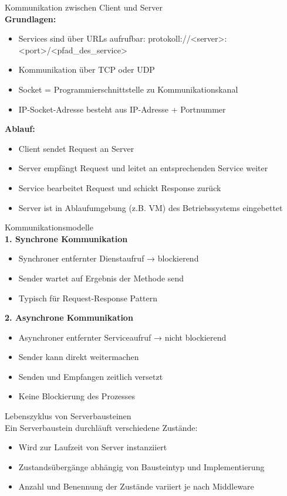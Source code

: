 \begin{concept}{Kommunikation zwischen Client und Server}\\
\textbf{Grundlagen:}
\begin{itemize}
    \item Services sind über URLs aufrufbar: protokoll://<server>:<port>/<pfad_des_service>
    \item Kommunikation über TCP oder UDP
    \item Socket = Programmierschnittstelle zu Kommunikationskanal
    \item IP-Socket-Adresse besteht aus IP-Adresse + Portnummer
\end{itemize}

\textbf{Ablauf:}
\begin{itemize}
    \item Client sendet Request an Server
    \item Server empfängt Request und leitet an entsprechenden Service weiter
    \item Service bearbeitet Request und schickt Response zurück
    \item Server ist in Ablaufumgebung (z.B. VM) des Betriebssystems eingebettet
\end{itemize}
\end{concept}

\begin{concept}{Kommunikationsmodelle}\\
\textbf{1. Synchrone Kommunikation}
\begin{itemize}
    \item Synchroner entfernter Dienstaufruf → blockierend
    \item Sender wartet auf Ergebnis der Methode send
    \item Typisch für Request-Response Pattern
\end{itemize}

\textbf{2. Asynchrone Kommunikation}
\begin{itemize}
    \item Asynchroner entfernter Serviceaufruf → nicht blockierend
    \item Sender kann direkt weitermachen
    \item Senden und Empfangen zeitlich versetzt
    \item Keine Blockierung des Prozesses
\end{itemize}
\end{concept}

\begin{concept}{Lebenszyklus von Serverbausteinen}\\
Ein Serverbaustein durchläuft verschiedene Zustände:
\begin{itemize}
    \item Wird zur Laufzeit von Server instanziiert
    \item Zustandsübergänge abhängig von Bausteintyp und Implementierung
    \item Anzahl und Benennung der Zustände variiert je nach Middleware
\end{itemize}
\end{concept}

